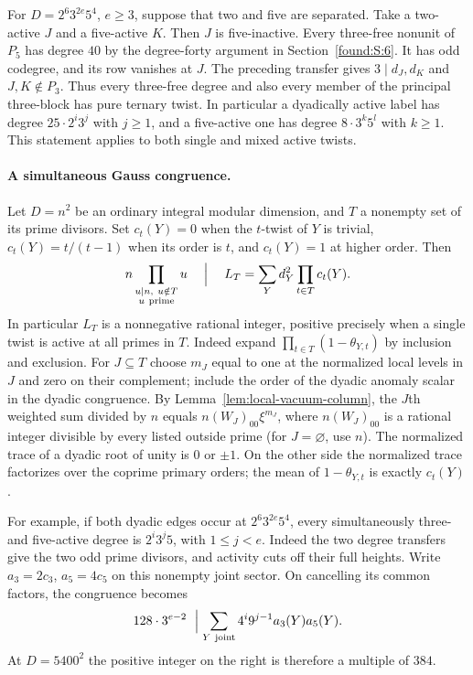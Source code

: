 \documentclass[11pt,a4paper]{article}
\numberwithin{equation}{section}
\theoremstyle{remark}
\begin{document}
For $D=2^6 3^{2e}5^4$, $e\ge3$, suppose that two and five are
separated. Take a two-active $J$ and a five-active $K$. Then $J$ is
five-inactive. Every three-free nonunit of $P_5$ has degree $40$ by
the degree-forty argument in Section~\ref{found:S:6}. It has odd codegree,
and its row vanishes at $J$. The preceding transfer gives
$3\mid d_J,d_K$ and $J,K\notin P_3$. Thus every three-free degree and
also every member of the principal three-block has pure ternary
twist. In particular a dyadically active label has degree
$25\cdot2^i3^j$ with $j\ge1$, and a five-active one has degree
$8\cdot3^k5^l$ with $k\ge1$. This statement applies to both single
and mixed active twists.

\paragraph{A simultaneous Gauss congruence.}
Let $D=n^2$ be an ordinary integral modular dimension, and $T$ a
nonempty set of its prime divisors. Set $c_t(Y)=0$ when the $t$-twist
of $Y$ is trivial, $c_t(Y)=t/(t-1)$ when its order is $t$, and
$c_t(Y)=1$ at higher order. Then
\[
 n\prod_{\substack{u\mid n,\ u\notin T\\u\ {\rm prime}}}u
 \quad\Bigm|\quad
 L_T=\sum_Y d_Y^2\prod_{t\in T}c_t(Y).
\]
In particular $L_T$ is a nonnegative rational integer, positive
precisely when a single twist is active at all primes in $T$.
Indeed expand $\prod_{t\in T}(1-\theta_{Y,t})$ by inclusion
and exclusion. For $J\subseteq T$ choose $m_J$ equal to one at
the normalized local levels in $J$ and zero on their complement;
include the order of the dyadic anomaly scalar in the dyadic
congruence. By Lemma~\ref{lem:local-vacuum-column}, the $J$th weighted sum divided by
$n$ equals $n(W_J)_{00}\xi^{m_J}$, where $n(W_J)_{00}$ is a
rational integer divisible by every listed outside prime (for
$J=\varnothing$, use $n$). The normalized trace of a dyadic root
of unity is $0$ or $\pm1$. On the other side the normalized trace
factorizes over the coprime primary orders; the mean of
$1-\theta_{Y,t}$ is exactly $c_t(Y)$.

For example, if both dyadic edges occur at $2^6 3^{2e}5^4$,
every simultaneously three- and five-active degree is $2^i3^j5$,
with $1\le j<e$. Indeed the two degree transfers give the two odd
prime divisors, and activity cuts off their full heights.
Write $a_3=2c_3$, $a_5=4c_5$ on this nonempty joint sector.
On cancelling its common factors, the congruence becomes
\[
  128\cdot3^{e-2}\ \Bigm|       \sum_{Y\ {\rm joint}}4^i9^{j-1}a_3(Y)a_5(Y).
\]
At $D=5400^2$ the positive integer on the right is
therefore a multiple of $384$.
\end{document}
